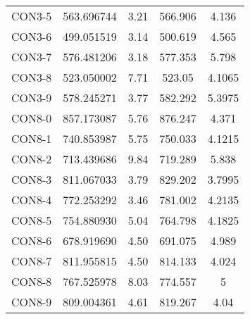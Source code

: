 \begin{table}[ht]
\begin{tabular}{c c c c c}
CON3-5 & 563.696744 & 3.21 & 566.906 & 4.136 \\
CON3-6 & 499.051519 & 3.14 & 500.619 & 4.565 \\
CON3-7 & 576.481206 & 3.18 & 577.353 & 5.798 \\
CON3-8 & 523.050002 & 7.71 & 523.05 & 4.1065 \\
CON3-9 & 578.245271 & 3.77 & 582.292 & 5.3975 \\
CON8-0 & 857.173087 & 5.76 & 876.247 & 4.371 \\
CON8-1 & 740.853987 & 5.75 & 750.033 & 4.1215 \\
CON8-2 & 713.439686 & 9.84 & 719.289 & 5.838 \\
CON8-3 & 811.067033 & 3.79 & 829.202 & 3.7995 \\
CON8-4 & 772.253292 & 3.46 & 781.002 & 4.2135 \\
CON8-5 & 754.880930 & 5.04 & 764.798 & 4.1825 \\
CON8-6 & 678.919690 & 4.50 & 691.075 & 4.989 \\
CON8-7 & 811.955815 & 4.50 & 814.133 & 4.024 \\
CON8-8 & 767.525978 & 8.03 & 774.557 & 5 \\
CON8-9 & 809.004361 & 4.61 & 819.267 & 4.04 \\
[1ex]\hline
\end{tabular}
\label{table:nonlin}
\end{table} \clearpage
